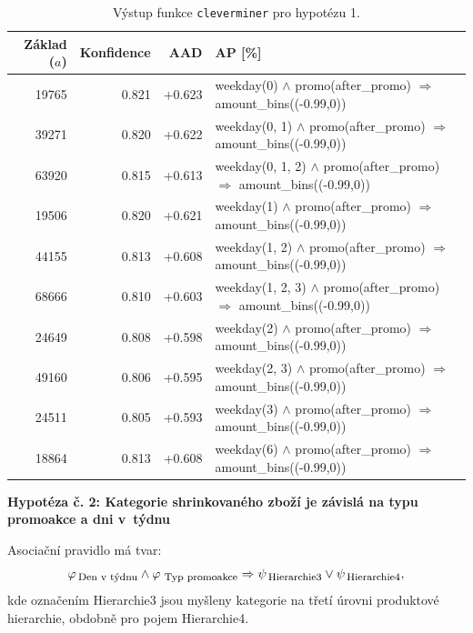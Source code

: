     \begin{table}[h!]
        \begin{center}
                \captionsetup{justification=centering}
        \caption{Výstup funkce \texttt{cleverminer} pro hypotézu 1.}
        \begin{tabular}{rrrp{7.5cm}}
            Základ ($a$) & Konfidence & AAD & AP [\%]\\
            \midrule
19765 & 0.821 & $+0.623$ & weekday(0) $\land$ promo(after\_promo) $\Rightarrow$ amount\_bins((-0.99,0)) \\
39271 & 0.820 & +0.622 & weekday(0, 1)  $\land$ promo(after\_promo) $\Rightarrow$ amount\_bins((-0.99,0)) \\
63920 & 0.815 & +0.613 & weekday(0, 1, 2)  $\land$ promo(after\_promo) $\Rightarrow$ amount\_bins((-0.99,0)) \\
19506 & 0.820 & +0.621 & weekday(1)  $\land$ promo(after\_promo) $\Rightarrow$ amount\_bins((-0.99,0)) \\
44155 & 0.813 & +0.608 & weekday(1, 2)  $\land$ promo(after\_promo) $\Rightarrow$ amount\_bins((-0.99,0)) \\
68666 & 0.810 & +0.603 & weekday(1, 2, 3)  $\land$ promo(after\_promo) $\Rightarrow$ amount\_bins((-0.99,0)) \\
24649 & 0.808 & +0.598 & weekday(2)  $\land$ promo(after\_promo) $\Rightarrow$ amount\_bins((-0.99,0)) \\
49160 & 0.806 & +0.595 & weekday(2, 3)  $\land$ promo(after\_promo) $\Rightarrow$ amount\_bins((-0.99,0)) \\
24511 & 0.805 & +0.593 &weekday(3) $\land$ promo(after\_promo) $\Rightarrow$ amount\_bins((-0.99,0)) \\
18864 & 0.813 & +0.608 &weekday(6)  $\land$ promo(after\_promo) $\Rightarrow$ amount\_bins((-0.99,0)) \\
    \end{tabular}
\label{tab:H1vysl}
\end{center}
\end{table}

\vspace*{1em}

\textbf{Hypotéza č. 2: Kategorie shrinkovaného zboží je závislá na typu promoakce a dni v~týdnu}

Asociační pravidlo má tvar:
\begin{equation}
    \varphi_{\mbox{\,\footnotesize Den v~týdnu}} \land \varphi_{\,\mbox{\,\footnotesize Typ promoakce}} \Rightarrow \psi_{\mbox{\,\footnotesize Hierarchie3}} \lor \psi_{\mbox{\,\footnotesize Hierarchie4}},
\end{equation}
kde označením Hierarchie3 jsou myšleny kategorie na třetí úrovni produktové hierarchie, obdobně pro pojem Hierarchie4.

